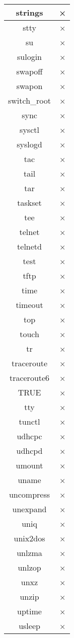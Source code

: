 \begin{longtable}{cc}
strings & × \\ \hline
stty & × \\ \hline
su & × \\ \hline
sulogin & × \\ \hline
swapoff & × \\ \hline
swapon & × \\ \hline
switch_root & × \\ \hline
sync & × \\ \hline
sysctl & × \\ \hline
syslogd & × \\ \hline
tac & × \\ \hline
tail & × \\ \hline
tar & × \\ \hline
taskset & × \\ \hline
tee & × \\ \hline
telnet & × \\ \hline
telnetd & × \\ \hline
test & × \\ \hline
tftp & × \\ \hline
time & × \\ \hline
timeout & × \\ \hline
top & × \\ \hline
touch & × \\ \hline
tr & × \\ \hline
traceroute & × \\ \hline
traceroute6 & × \\ \hline
TRUE & × \\ \hline
tty & × \\ \hline
tunctl & × \\ \hline
udhcpc & × \\ \hline
udhcpd & × \\ \hline
umount & × \\ \hline
uname & × \\ \hline
uncompress & × \\ \hline
unexpand & × \\ \hline
uniq & × \\ \hline
unix2dos & × \\ \hline
unlzma & × \\ \hline
unlzop & × \\ \hline
unxz & × \\ \hline
unzip & × \\ \hline
uptime & × \\ \hline
usleep & × \\ \hline

\end{longtable}
